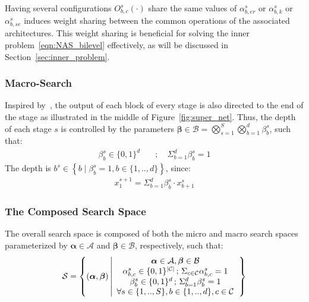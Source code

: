 \documentclass[dvipsnames,table,xcdraw]{article}
\newcommand{\balpha}{\bm{\alpha}}
\newcommand{\bbeta}{\bm{\beta}}
\begin{document}
Having several configurations $O^s_{b,c}(\cdot)$ share the same values of $\alpha^s_{b,er}$ or $\alpha^s_{b,k}$ or $\alpha^s_{b,se}$ induces weight sharing between the common operations of the associated architectures. This weight sharing is beneficial for solving the inner problem~\eqref{eqn:NAS_bilevel} effectively, as will be discussed in Section~\ref{sec:inner_problem}.


\subsubsection{Macro-Search}\label{sec:macro_search}
Inspired by~\cite{TF-NAS, OFA}, the output of each block of every stage is also directed to the end of the stage as illustrated in the middle of Figure~\ref{fig:super_net}. Thus, the depth of each stage $s$ is controlled by the parameters $\bbeta\in\mathcal{B}=\bigotimes_{s=1}^S\bigotimes_{b=1}^d \beta^s_b$, such that:
\begin{align*}
    \beta^s_b\in \{0, 1\}^d \quad &; \quad 
    \Sigma_{b=1}^d \beta^s_b = 1
\end{align*}
The depth is $b^s\!\in\!\left\{b\mid\beta^s_b=1, b\in\{1,..,d\}\right\}$, since:
\begin{align*}
    x^{s+1}_1=\Sigma_{b=1}^{d}\beta^s_b\cdot x^s_{b+1}
\end{align*}

\subsubsection{The Composed Search Space}\label{sec:composed_search_space}
The overall search space is composed of both the micro and macro search spaces parameterized by $\balpha\in\mathcal{A}$ and $\bbeta\in\mathcal{B}$, respectively, such that:
\begin{align}
   \mathcal{S} = \left\{(\balpha, \bbeta)\left\vert
   \begin{array}{c}
    \balpha\in\mathcal{A}, \bbeta\in\mathcal{B}
    \\
     \alpha^s_{b,c}\in \{0, 1\}^{\left|\mathcal{C}\right|} \,; \, 
    \Sigma_{c\in\mathcal{C}} \alpha^s_{b,c} = 1  \\
   \beta^s_b\in \{0, 1\}^d \,; \,  
    \Sigma_{b=1}^d \beta^s_b = 1 
    \\
    \forall s\in\{1,..,S\}, b\in\{1,..,d\},c\in\mathcal{C}
   \end{array}\right.
   \right\}
   \notag
\end{align}
\end{document}

